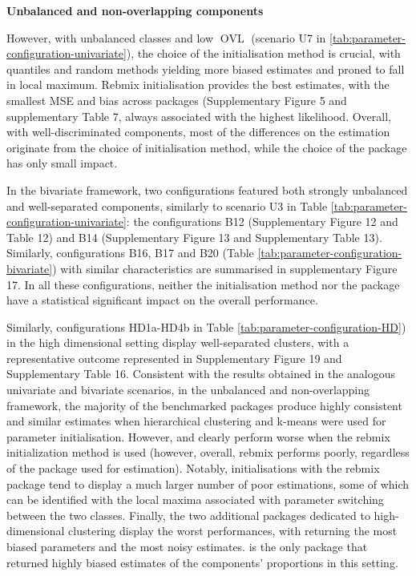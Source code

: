 \textbf{Unbalanced and non-overlapping components}

However, with unbalanced classes and low \(\operatorname{OVL}\) (scenario U7 in
\ref{tab:parameter-configuration-univariate}), the choice of the
initialisation method is crucial, with quantiles and random
methods yielding more biased estimates and proned to fall in local maximum. Rebmix initialisation provides the best estimates, with the smallest MSE and bias across packages (Supplementary Figure
5 and supplementary Table 7, always associated with the highest likelihood. Overall, with
well-discriminated components, most of the differences on the estimation
originate from the choice of initialisation method, while the choice of
the package has only small impact.

In the bivariate framework, two configurations featured both strongly unbalanced and well-separated components, similarly to scenario U3 in Table \ref{tab:parameter-configuration-univariate}: the configurations B12 (Supplementary Figure 12 and Table 12) and B14 (Supplementary Figure 13 and Supplementary Table 13). Similarly, configurations B16, B17 and B20 (Table \ref{tab:parameter-configuration-bivariate}) with similar characteristics are summarised in supplementary Figure 17. In all these configurations, neither the initialisation method nor the package have a statistical significant impact on the overall performance.

Similarly, configurations HD1a-HD4b in Table \ref{tab:parameter-configuration-HD}) in the high dimensional setting display well-separated clusters, with a representative outcome represented in Supplementary Figure 19 and Supplementary Table 16. Consistent with the results obtained in the analogous univariate and bivariate scenarios, in the unbalanced and non-overlapping framework, the majority of the benchmarked packages produce highly consistent and similar estimates when hierarchical clustering and k-means were used for parameter initialisation. However,  and  clearly perform worse when the rebmix initialization method is used (however, overall, rebmix performs poorly, regardless of the package used for estimation). Notably, initialisations with the rebmix package tend to display a much larger number of poor estimations, some of which can be identified with the local maxima associated with parameter switching between the two classes. Finally, the two additional packages dedicated to high-dimensional clustering display the worst performances, with  returning the most biased parameters and  the most noisy estimates.  is the only package that returned highly biased estimates of the components' proportions in this setting.

